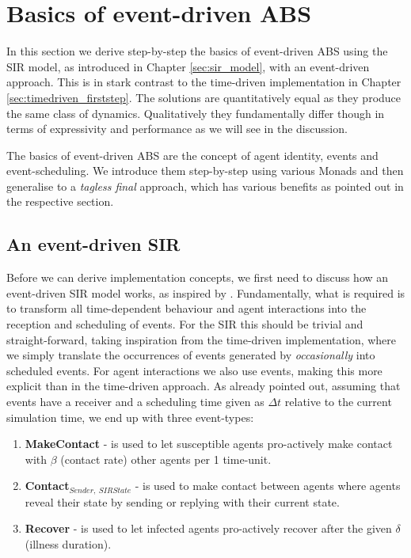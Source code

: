 \section{Basics of event-driven ABS}
\label{sec:eventdriven_basics}

In this section we derive step-by-step the basics of event-driven ABS using the SIR model, as introduced in Chapter \ref{sec:sir_model}, with an event-driven approach. This is in stark contrast to the time-driven implementation in Chapter \ref{sec:timedriven_firststep}. The solutions are quantitatively equal as they produce the same class of dynamics. Qualitatively they fundamentally differ though in terms of expressivity and performance as we will see in the discussion.

The basics of event-driven ABS are the concept of agent identity, events and event-scheduling. We introduce them step-by-step using various Monads and then generalise to a \textit{tagless final} approach, which has various benefits as pointed out in the respective section. 

\subsection{An event-driven SIR}
Before we can derive implementation concepts, we first need to discuss how an event-driven SIR model works, as inspired by \cite{macal_agent-based_2010}. Fundamentally, what is required is to transform all time-dependent behaviour and agent interactions into the reception and scheduling of events. For the SIR this should be trivial and straight-forward, taking inspiration from the time-driven implementation, where we simply translate the occurrences of events generated by \textit{occasionally} into scheduled events. For agent interactions we also use events, making this more explicit than in the time-driven approach. As already pointed out, assuming that events have a receiver and a scheduling time given as $\Delta t$ relative to the current simulation time, we end up with three event-types:

\begin{enumerate}
	\item \textbf{MakeContact} - is used to let susceptible agents pro-actively make contact with $\beta$ (contact rate) other agents per 1 time-unit.
	\item \textbf{Contact$_{Sender, \ SIRState}$} - is used to make contact between agents where agents reveal their state by sending or replying with their current state.
	\item \textbf{Recover} - is used to let infected agents pro-actively recover after the given $\delta$ (illness duration). 
\end{enumerate}

